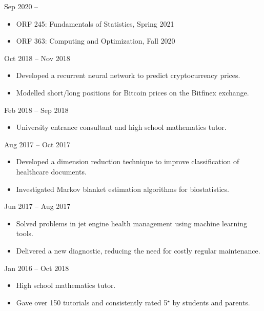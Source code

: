 \documentclass[
  date,
  number,
]{wgu-cv}
\begin{document}
{}
{Sep 2020 --}

\begin{itemize}
  \item
    ORF 245:
    Fundamentals of Statistics,
    Spring 2021
  \item
    ORF 363:
    Computing and Optimization,
    Fall 2020
\end{itemize}


{}
{Oct 2018 -- Nov 2018}

\begin{itemize}
	\item Developed a recurrent neural network to predict cryptocurrency prices.
	\item Modelled short/long positions for Bitcoin prices on the Bitfinex exchange.
\end{itemize}


{}
{Feb 2018 -- Sep 2018}

\begin{itemize}
\item University entrance consultant and high school mathematics tutor.
\end{itemize}


{}
{Aug 2017 -- Oct 2017}

\begin{itemize}
	\item Developed a dimension reduction technique to
    improve classification of healthcare documents.
	\item Investigated Markov blanket estimation algorithms for biostatistics.
\end{itemize}


{}
{Jun 2017 -- Aug 2017}

\begin{itemize}
	\item Solved problems in jet engine health management using machine learning tools.
	\item Delivered a new diagnostic, reducing the need for costly regular maintenance.
\end{itemize}


{}
{Jan 2016 -- Oct 2018}

\begin{itemize}
	\item High school mathematics tutor.
	\item Gave over 150 tutorials and consistently rated 5$^\star$ by students and parents.
\end{itemize}
\end{document}
